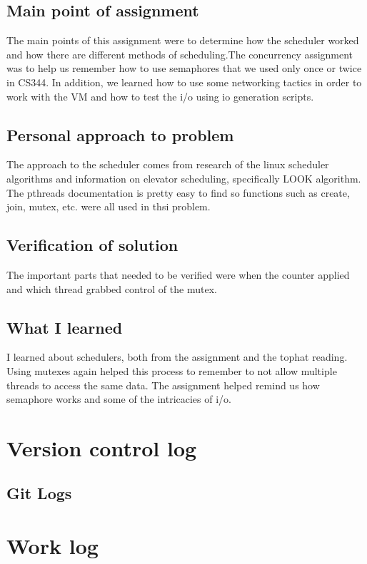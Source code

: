 \documentclass[letterpaper,10pt,titlepage]{article}
\begin{document}
\subsection{Main point of assignment}
The main points of this assignment were to determine how the scheduler worked and how there are different methods of scheduling.The concurrency assignment was to help us remember how to use semaphores that we used only once or twice in CS344.  In addition, we learned how to use some networking tactics in order to work with the VM and how to test the i/o using io generation scripts.

\subsection{Personal approach to problem}
The approach to the scheduler comes from research of the linux scheduler algorithms and information on elevator scheduling, specifically LOOK algorithm.  The pthreads documentation is pretty easy to find so functions such as create, join, mutex, etc. were all used in thsi problem.  

\subsection{Verification of solution}
The important parts that needed to be verified were when the counter applied and which thread grabbed control of the mutex.  


\subsection{What I learned}
I learned about schedulers, both from the assignment and the tophat reading. Using mutexes again helped this process to remember to not allow multiple threads to access the same data.  The assignment helped remind us how semaphore works and some of the intricacies of i/o.

\section{Version control log}
\subsection{Git Logs}


\section{Work log}
\end{document}

